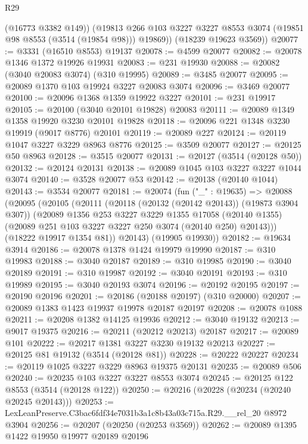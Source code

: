 \begin{lexlean}{R29}
\begin{coremodule}
          (@16773 @3382 @149))
        (@19813 @266 @103 @3227 @3227 @8553 @3074 (@19851 @98 @8553 (@3514 (@19854 @98))) @19869))
      (@18239 @19623 @3569))
@20077 := @3331 (@16510 @8553) @19137
@20078 := @4599 @20077
@20082 := @20078 @1346 @1372 @19926 @19931
@20083 := @231 @19930
@20088 := @20082 (@3040 @20083 @3074) (@310 @19995)
@20089 := @3485 @20077
@20095 := @20089 @1370 @103 @19924 @3227 @20083 @3074
@20096 := @3469 @20077
@20100 := @20096 @1368 @1359 @19922 @3227
@20101 := @231 @19917
@20105 := @20100 (@3040 @20101 @19828) @20083
@20111 := @20089 @1349 @1358 @19920 @3230 @20101 @19828
@20118 := @20096 @221 @1348 @3230 @19919 (@9017 @8776) @20101
@20119 := @20089 @227
@20124 := @20119 @1047 @3227 @3229 @8963 @8776
@20125 := @3509 @20077
@20127 := @20125 @50 @8963
@20128 := @3515 @20077
@20131 := @20127 (@3514 (@20128 @50))
@20132 := @20124 @20131
@20138 := @20089 @1045 @103 @3227 @3227 @1044 @3074
@20140 := @3528 @20077 @53
@20142 := @20138 (@20140 @1044)
@20143 := @3534 @20077
@20181 := @20074
    (fun ("_" : @19635) =>
    @20088
      (@20095
        (@20105
          (@20111
            (@20118 (@20132 (@20142 @20143)) (@19873 @3904 @307))
            (@20089
              @1356
              @253
              @3227
              @3229
              @1355
              @17058
              (@20140 @1355)
              (@20089 @251 @103 @3227 @3227 @250 @3074 (@20140 @250) @20143)))
          (@18222 @19917 @1354 @81))
        @20143)
      (@19905 @19930))
@20182 := @19634 @3914
@20186 := @20078 @1378 @1424 @19979 @19990
@20187 := @310 @19983
@20188 := @3040 @20187
@20189 := @310 @19985
@20190 := @3040 @20189
@20191 := @310 @19987
@20192 := @3040 @20191
@20193 := @310 @19989
@20195 := @3040 @20193 @3074
@20196 := @20192 @20195
@20197 := @20190 @20196
@20201 := @20186 (@20188 @20197) (@310 @20000)
@20207 := @20089 @1383 @1423 @19937 @19978 @20187 @20197
@20208 := @20078 @1088
@20211 := @20208 @1382 @14125 @19936
@20212 := @3040 @19132
@20213 := @9017 @19375
@20216 := @20211 (@20212 @20213) @20187
@20217 := @20089 @101
@20222 := @20217 @1381 @3227 @3230 @19132 @20213
@20227 := @20125 @81 @19132 (@3514 (@20128 @81))
@20228 := @20222 @20227
@20234 := @20119 @1025 @3227 @3229 @8963 @19375 @20131
@20235 := @20089 @506
@20240 := @20235 @103 @3227 @3227 @8553 @3074
@20245 := @20125 @122 @8553 (@3514 (@20128 @122))
@20250 := @20216 (@20228 (@20234 (@20240 @20245 @20143)))
@20253 := LexLeanPreserve.C3bac6fdf34e7031b3a1c8b43a03c715a.R29.__rel_20 @8972 @3904
@20256 := @20207 (@20250 (@20253 @3569))
@20262 := @20089 @1395 @1422 @19950 @19977 @20189 @20196

\end{coremodule}
\end{lexlean}

